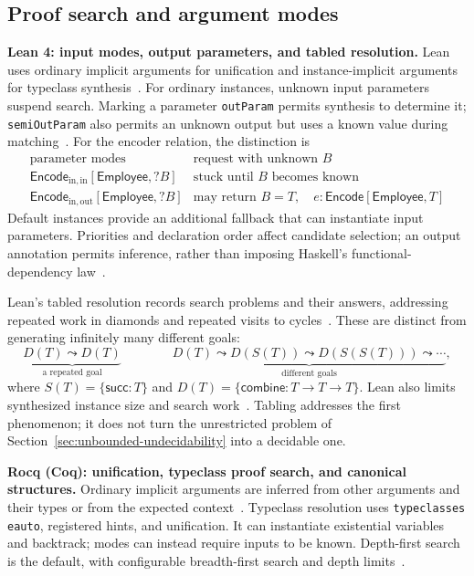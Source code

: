\documentclass[10pt,a4paper]{article}
\newcommand{\kw}[1]{\mathsf{#1}}
\begin{document}
\subsection{Proof search and argument modes}
\textbf{Lean 4: input modes, output parameters, and tabled resolution.}
Lean uses ordinary implicit arguments for unification and instance-implicit
arguments for typeclass synthesis~\cite{lean-functions}.
For ordinary instances, unknown input parameters suspend search. Marking a parameter
\texttt{outParam} permits synthesis to determine it; \texttt{semiOutParam} also
permits an unknown output but uses a known value during matching~\cite{lean-synthesis}.
For the encoder relation, the distinction is
\[
\begin{array}{c|c}
 \text{parameter modes} & \text{request with unknown }B\\ \hline
 \kw{Encode}_{\mathrm{in,in}}[\kw{Employee},?B]
   & \text{stuck until }B\text{ becomes known}\\[3pt]
 \kw{Encode}_{\mathrm{in,out}}[\kw{Employee},?B]
   & \text{may return }B=T,\quad e:\kw{Encode}[\kw{Employee},T]
\end{array}
\]
Default instances provide an additional fallback that can instantiate input
parameters. Priorities and declaration order affect candidate selection;
an output annotation permits inference, rather than imposing Haskell's
functional-dependency law~\cite{lean-synthesis}.

Lean's tabled resolution records search problems and their answers, addressing
repeated work in diamonds and repeated visits to cycles~\cite{tabled-resolution}.
These are distinct from generating infinitely many different goals:
\[
 \underbrace{D(T)\leadsto D(T)}_{\text{a repeated goal}}
 \qquad\qquad
 \underbrace{D(T)\leadsto D(S(T))\leadsto D(S(S(T)))\leadsto\cdots}_{\text{different goals}},
\]
where $S(T)=\{\kw{succ}:T\}$ and $D(T)=\{\kw{combine}:T\to T\to T\}$.
Lean also limits synthesized instance size and search work~\cite{lean-synthesis}.
Tabling addresses the first phenomenon; it does not turn the unrestricted problem
of Section~\ref{sec:unbounded-undecidability} into a decidable one.

\textbf{Rocq (Coq): unification, typeclass proof search, and canonical structures.}
Ordinary implicit arguments are inferred from other arguments and their types
or from the expected context~\cite{rocq-implicit}.
Typeclass resolution uses \texttt{typeclasses eauto}, registered hints, and
unification. It can instantiate existential variables and backtrack; modes can
instead require inputs to be known. Depth-first search is the default, with
configurable breadth-first search and depth limits~\cite{rocq-typeclasses}.
\end{document}
